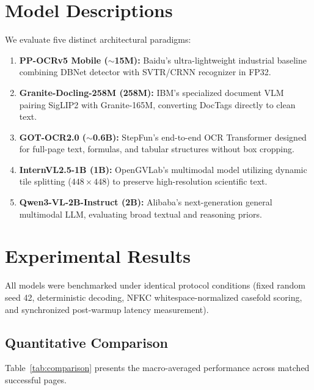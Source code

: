 \documentclass[10pt,twocolumn,a4paper]{article}
\begin{document}
\section{Model Descriptions}
We evaluate five distinct architectural paradigms:
\begin{enumerate}
    \item \textbf{PP-OCRv5 Mobile ($\sim$15M):} Baidu's ultra-lightweight industrial baseline combining DBNet detector with SVTR/CRNN recognizer in FP32.
    \item \textbf{Granite-Docling-258M (258M):} IBM's specialized document VLM pairing SigLIP2 with Granite-165M, converting DocTags directly to clean text.
    \item \textbf{GOT-OCR2.0 ($\sim$0.6B):} StepFun's end-to-end OCR Transformer designed for full-page text, formulas, and tabular structures without box cropping.
    \item \textbf{InternVL2.5-1B (1B):} OpenGVLab's multimodal model utilizing dynamic tile splitting ($448\times 448$) to preserve high-resolution scientific text.
    \item \textbf{Qwen3-VL-2B-Instruct (2B):} Alibaba's next-generation general multimodal LLM, evaluating broad textual and reasoning priors.
\end{enumerate}

\section{Experimental Results}
All models were benchmarked under identical protocol conditions (fixed random seed 42, deterministic decoding, NFKC whitespace-normalized casefold scoring, and synchronized post-warmup latency measurement).

\subsection{Quantitative Comparison}
Table~\ref{tab:comparison} presents the macro-averaged performance across matched successful pages.
\begin{table}[h]
\centering
\caption{Quantitative evaluation across the 5 models.}
\label{tab:comparison}
\end{table}
\end{document}
